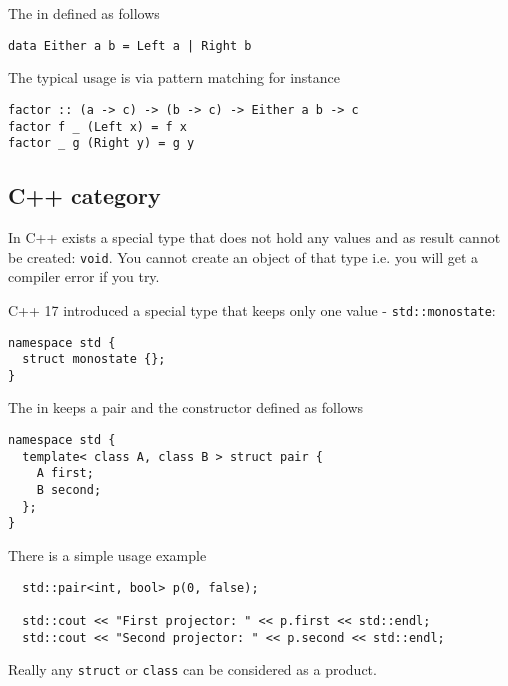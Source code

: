 \begin{example}
\label{ex:hask_sum}
The  in  defined as
follows 
\begin{verbatim}
data Either a b = Left a | Right b
\end{verbatim}

The typical usage is via pattern matching for instance 
\begin{verbatim}
factor :: (a -> c) -> (b -> c) -> Either a b -> c
factor f _ (Left x) = f x
factor _ g (Right y) = g y
\end{verbatim}
\end{example}


\subsection{\textbf{C++} category}
\begin{example}
\label{ex:cpp_initial_object}
In C++ exists a special type that does not hold any values and as
result cannot be created: \texttt{void}.
You cannot create an object of that type i.e. you will get a compiler
error if you try.
\end{example}

\begin{example}
\label{ex:cpp_terminal_object}
C++ 17 introduced a special type that keeps only one value -
\texttt{std::monostate}:  
\begin{verbatim}
namespace std {
  struct monostate {};
}
\end{verbatim}
\end{example}

\begin{example}[Product][\textbf{C++}]
\label{ex:cpp_product}
The  in  keeps a
pair and the constructor defined as follows
\begin{verbatim}
namespace std {
  template< class A, class B > struct pair {
    A first;
    B second;
  };
}
\end{verbatim}

There is a simple usage example
\begin{verbatim}
  std::pair<int, bool> p(0, false);

  std::cout << "First projector: " << p.first << std::endl;
  std::cout << "Second projector: " << p.second << std::endl;

\end{verbatim}
Really any \texttt{struct} or \texttt{class} can be
considered as a product. 
\end{example}


